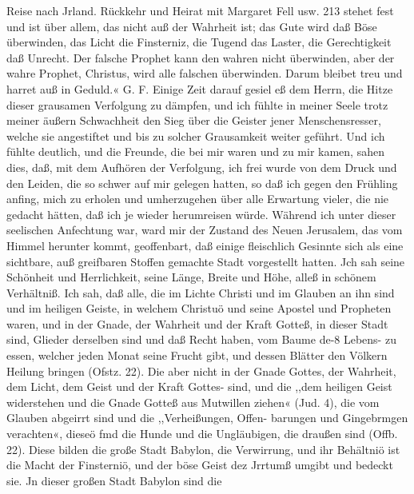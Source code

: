 Reise nach Jrland. Rückkehr und Heirat mit Margaret Fell usw. 213
stehet fest und ist über allem, das nicht auß der Wahrheit ist;
das Gute wird daß Böse überwinden, das Licht die Finsterniz,
die Tugend das Laster, die Gerechtigkeit daß Unrecht. Der falsche
Prophet kann den wahren nicht überwinden, aber der wahre
Prophet, Christus, wird alle falschen überwinden. Darum bleibet
treu und harret auß in Geduld.«
G. F.
Einige Zeit darauf gesiel eß dem Herrn, die Hitze dieser
grausamen Verfolgung zu dämpfen, und ich fühlte in meiner
Seele trotz meiner äußern Schwachheit den Sieg über die Geister
jener Menschensresser, welche sie angestiftet und bis zu solcher
Grausamkeit weiter geführt. Und ich fühlte deutlich, und die
Freunde, die bei mir waren und zu mir kamen, sahen dies, daß,
mit dem Aufhören der Verfolgung, ich frei wurde von dem Druck
und den Leiden, die so schwer auf mir gelegen hatten, so daß ich
gegen den Frühling anfing, mich zu erholen und umherzugehen
über alle Erwartung vieler, die nie gedacht hätten, daß ich je
wieder herumreisen würde.
Während ich unter dieser seelischen Anfechtung war, ward
mir der Zustand des Neuen Jerusalem, das vom Himmel herunter
kommt, geoffenbart, daß einige fleischlich Gesinnte sich als eine
sichtbare, auß greifbaren Stoffen gemachte Stadt vorgestellt hatten.
Jch sah seine Schönheit und Herrlichkeit, seine Länge, Breite und
Höhe, alleß in schönem Verhältniß. Ich sah, daß alle, die im
Lichte Christi und im Glauben an ihn sind und im heiligen
Geiste, in welchem Christuö und seine Apostel und Propheten
waren, und in der Gnade, der Wahrheit und der Kraft Gotteß,
in dieser Stadt sind, Glieder derselben sind und daß Recht haben,
vom Baume de-8 Lebens- zu essen, welcher jeden Monat seine Frucht
gibt, und dessen Blätter den Völkern Heilung bringen (Ofstz. 22).
Die aber nicht in der Gnade Gottes, der Wahrheit, dem Licht,
dem Geist und der Kraft Gottes- sind, und die ,,dem heiligen Geist
widerstehen und die Gnade Gotteß aus Mutwillen ziehen« (Jud. 4),
die vom Glauben abgeirrt sind und die ,,Verheißungen, Offen-
barungen und Gingebrmgen verachten«, dieseö fmd die Hunde
und die Ungläubigen, die draußen sind (Offb. 22). Diese bilden
die große Stadt Babylon, die Verwirrung, und ihr Behältniö ist
die Macht der Finsterniö, und der böse Geist dez Jrrtumß umgibt
und bedeckt sie. Jn dieser großen Stadt Babylon sind die


